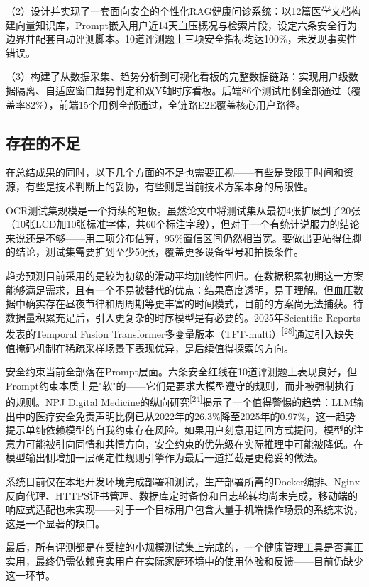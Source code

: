 \documentclass[zihao=-4,a4paper]{ctexart}
\numberwithin{figure}{section}
\numberwithin{table}{section}
\begin{document}
（2）设计并实现了一套面向安全的个性化RAG健康问诊系统：以12篇医学文档构建向量知识库，Prompt嵌入用户近14天血压概况与检索片段，设定六条安全行为边界并配套自动评测脚本。10道评测题上三项安全指标均达100\%，未发现事实性错误。

（3）构建了从数据采集、趋势分析到可视化看板的完整数据链路：实现用户级数据隔离、自适应窗口趋势判定和双Y轴时序看板。后端86个测试用例全部通过（覆盖率82\%），前端15个用例全部通过，全链路E2E覆盖核心用户路径。

\subsection{存在的不足}

在总结成果的同时，以下几个方面的不足也需要正视——有些是受限于时间和资源，有些是技术判断上的妥协，有些则是当前技术方案本身的局限性。

OCR测试集规模是一个持续的短板。虽然论文中将测试集从最初4张扩展到了20张（10张LCD加10张标准字体，共60个标注字段），但对于一个有统计说服力的结论来说还是不够——用二项分布估算，95\%置信区间仍然相当宽。要做出更站得住脚的结论，测试集需要扩到至少50张，覆盖更多设备型号和拍摄条件。

趋势预测目前采用的是较为初级的滑动平均加线性回归。在数据积累初期这一方案能够满足需求，且有一个不易被替代的优点：结果高度透明，易于理解。但血压数据中确实存在昼夜节律和周周期等更丰富的时间模式，目前的方案尚无法捕获。待数据量积累充足后，引入更复杂的时序模型是有必要的。2025年Scientific Reports发表的Temporal Fusion Transformer多变量版本（TFT-multi）\textsuperscript{[28]}通过引入缺失值掩码机制在稀疏采样场景下表现优异，是后续值得探索的方向。

安全约束当前全部落在Prompt层面。六条安全红线在10道评测题上表现良好，但Prompt约束本质上是"软"的——它们是要求大模型遵守的规则，而非被强制执行的规则。NPJ Digital Medicine的纵向研究\textsuperscript{[24]}揭示了一个值得警惕的趋势：LLM输出中的医疗安全免责声明比例已从2022年的26.3\%降至2025年的0.97\%，这一趋势提示单纯依赖模型的自我约束存在风险。如果用户刻意用迂回方式提问，模型的注意力可能被引向同情和共情方向，安全约束的优先级在实际推理中可能被降低。在模型输出侧增加一层确定性规则引擎作为最后一道拦截是更稳妥的做法。

系统目前仅在本地开发环境完成部署和测试，生产部署所需的Docker编排、Nginx反向代理、HTTPS证书管理、数据库定时备份和日志轮转均尚未完成，移动端的响应式适配也未实现——对于一个目标用户包含大量手机端操作场景的系统来说，这是一个显著的缺口。

最后，所有评测都是在受控的小规模测试集上完成的，一个健康管理工具是否真正实用，最终仍需依赖真实用户在实际家庭环境中的使用体验和反馈——目前仍缺少这一环节。
\end{document}
